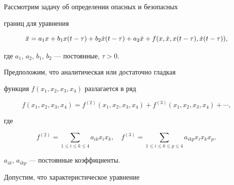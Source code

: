\date{} 




\pagestyle{plain} %


 




\maketitle 


\label{begin} 


 


 


Рассмотрим задачу об определении опасных и безопасных 


границ для уравнения 


\begin{equation}


\Ddot x=a_1x+b_1x(t-\tau)+b_2\Dot x(t-\tau)+ 


a_2\Dot x+f(x,\Dot x,x(t-\tau),\Dot x(t-\tau)), 


\end{equation}


где $a_1$, $a_2$, $b_1$, $b_2$ --- постоянные, $\tau>0$. 


 


Предположим, что аналитическая или достаточно гладкая 


функция $f(x_1,x_2,x_3,x_4)$ разлагается в ряд 


$$ 


f(x_1,x_2,x_3,x_4)=f^{(2)}(x_1,x_2,x_3,x_4)+ 


f^{(3)}(x_1,x_2,x_3,x_4)+\dotsb, 


$$ 


где 


$$ 


f^{(2)}=\sum_{1\le i\le k\le4}a_{ik}x_i x_k,\quad 


f^{(3)}=\sum_{1\le i\le k\le p\le4} 


a_{ikp}x_i x_k x_p, 


$$ 


$a_{ik}$, $a_{ikp}$ --- постоянные коэффициенты. 


 


Допустим, что характеристическое уравнение 


